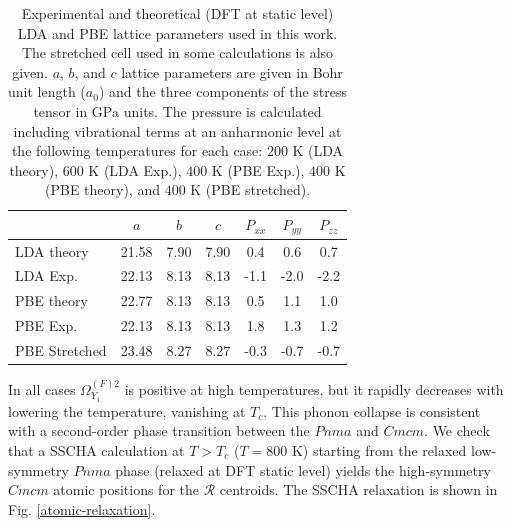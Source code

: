 \begin{table}
\begin{center}
\begin{tabular*}{0.65\textwidth}{l c c c c c c}
 \hline
 \hline
            & $a$  & $b$  & $c$  & $P_{xx}$ & $P_{yy}$ & $P_{zz}$ \\
 \hline
 LDA theory                  &  21.58  &  7.90  & 7.90  &  0.4  &  0.6  &  0.7  \\
 LDA Exp.                    &  22.13  &  8.13  & 8.13  & -1.1  & -2.0  & -2.2  \\
 PBE theory                  &  22.77  &  8.13  & 8.13  &  0.5  &  1.1  &  1.0  \\
 PBE Exp.                    &  22.13  &  8.13  & 8.13  &  1.8  &  1.3  &  1.2  \\
 PBE Stretched               &  23.48  &  8.27  & 8.27  & -0.3  & -0.7  & -0.7  \\
 \hline
 \hline
\end{tabular*}
\end{center}
\caption[Experimental and theoretical lattice parameters of $Cmcm$ SnSe]{Experimental\cite{zhao2014ultralow} and 
	theoretical (DFT at static level) LDA and PBE lattice parameters used in this work. The stretched cell used 
	in some calculations is also given. $a$, $b$, and $c$ lattice parameters are given in Bohr unit length 
	($a_0$) and the three components of the stress tensor in GPa units. The pressure is calculated including 
	vibrational terms at an anharmonic level at the following temperatures for each case: $200$ K (LDA theory), 
	$600$ K (LDA Exp.), $400$ K (PBE Exp.), $400$ K (PBE theory), and $400$ K (PBE stretched).}
\label{cell-parameters}
\end{table}
In all cases $\Omega^{(F)2}_{Y_{1}}$ is positive at high temperatures, but it rapidly decreases with lowering the temperature, vanishing at $T_{c}$. This phonon collapse is consistent with a second-order phase transition between
the $Pnma$ and $Cmcm$. We check that a SSCHA calculation at $T>T_{c}$ ($T=800$ K) starting from the relaxed low-symmetry $Pnma$ phase (relaxed at DFT static level) yields the high-symmetry $Cmcm$ atomic positions for the 
$\boldsymbol{\mathcal{R}}$ centroids. The SSCHA relaxation is shown in Fig. \ref{atomic-relaxation}.
